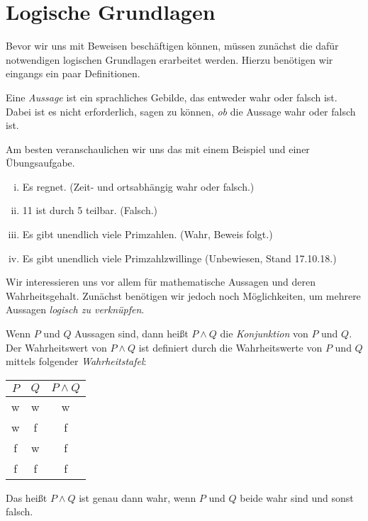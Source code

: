 \chapter{Logische Grundlagen}

Bevor wir uns mit Beweisen beschäftigen können, müssen zunächst die dafür
notwendigen logischen Grundlagen erarbeitet werden.
Hierzu benötigen wir eingangs ein paar Definitionen.

\begin{mydef}
Eine \textit{Aussage} ist ein sprachliches Gebilde, das entweder wahr oder
falsch ist.
Dabei ist es nicht erforderlich, sagen zu können, \textit{ob} die Aussage wahr
oder falsch ist.
\end{mydef}


Am besten veranschaulichen wir uns das mit einem Beispiel und einer Übungsaufgabe.


\begin{example}
\begin{enumerate}[(i)]
\item Es regnet. (Zeit- und ortsabhängig wahr oder falsch.)
\item 11 ist durch 5 teilbar. (Falsch.)
\item Es gibt unendlich viele Primzahlen. (Wahr, Beweis folgt.)
\item Es gibt unendlich viele Primzahlzwillinge (Unbewiesen, Stand 17.10.18.)
\end{enumerate}
\end{example}


Wir interessieren uns vor allem für mathematische Aussagen und deren
Wahrheitsgehalt.
Zunächst benötigen wir jedoch noch Möglichkeiten, um mehrere Aussagen
\textit{logisch zu verknüpfen}.


\begin{mydef}
Wenn $P$ und $Q$ Aussagen sind, dann heißt $P \wedge Q$ die
\textit{Konjunktion} von $P$ und $Q$.
Der Wahrheitswert von $P \wedge Q$ ist definiert durch die Wahrheitswerte von
$P$ und $Q$ mittels folgender \textit{Wahrheitstafel}:

\begin{table}[H]
\centering
\begin{tabular}{c|c|c}
$P$ & $Q$ & $P \wedge Q$ \\ \hline
w   & w   & w \\
w   & f   & f \\
f   & w   & f \\
f   & f   & f
\end{tabular}
\end{table}

Das heißt $P \wedge Q$ ist genau dann wahr, wenn $P$ und $Q$ beide wahr sind
und sonst falsch.
\end{mydef}


